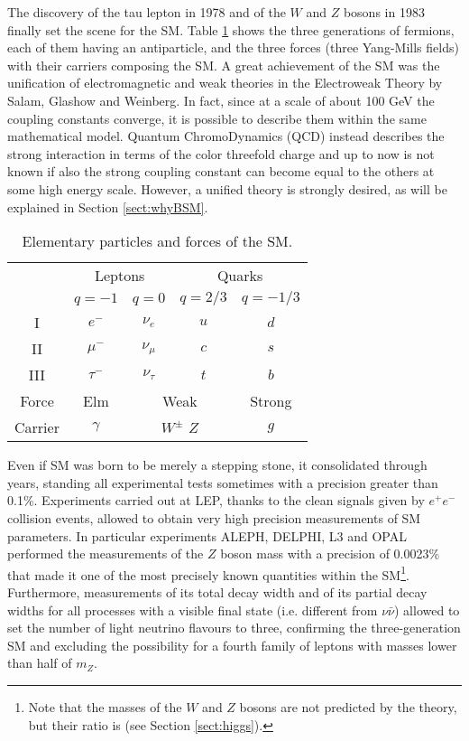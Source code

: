 The discovery of the tau lepton in 1978 and of the $W$ and $Z$ bosons in 1983 finally set the scene for the SM. Table \ref{tab:SM} shows the three generations of fermions, each of them having an antiparticle, and the three forces (three Yang-Mills fields) with their carriers composing the SM. A great achievement of the SM was the unification of electromagnetic and weak theories in the Electroweak Theory by Salam, Glashow and Weinberg. In fact, since at a scale of about 100 GeV the coupling constants converge, it is possible to describe them within the same mathematical model. Quantum ChromoDynamics (QCD) instead describes the strong interaction in terms of the color threefold charge and up to now is not known if also the strong coupling constant can become equal to the others at some high energy scale. However, a unified theory is strongly desired, as will be explained in Section \ref{sect:whyBSM}.
\begin{table}[htb]\centering\begin{tabular}{ccc|cc}
&\multicolumn{2}{c}{Leptons}&\multicolumn{2}{c}{Quarks} \\ 
& $q=-1$ & $q=0$ &$q=2/3$ &$q=-1/3$ \\ \hline
I & $e^{-}$ & $\nu_{e}$ & $u$ & $d$ \\
II & $\mu^{-}$ & $\nu_{\mu}$ & $c$ & $s$ \\
III & $\tau^{-}$ & $\nu_{\tau}$ & $t$ & $b$ \\\hline\hline
Force & Elm &\multicolumn{2}{c}{Weak}& Strong\\
Carrier & $\gamma$ & \multicolumn{2}{c}{$W^{\pm}$ \quad $Z$} & $g$\\\hline \hline
\end{tabular}\caption{Elementary particles and forces of the SM.}\label{tab:SM} \end{table}

Even if SM was born to be merely a stepping stone, it consolidated through years, standing all experimental tests sometimes with a precision greater than 0.1\%. Experiments carried out at LEP, thanks to the clean signals given by $e^{+}e^{-}$ collision events, allowed to obtain very high precision measurements of SM parameters. In particular experiments ALEPH, DELPHI, L3 and OPAL performed the measurements of the $Z$ boson mass with a precision of 0.0023\% that made it one of the most precisely known quantities within the SM\footnote{Note that the masses of the $W$ and $Z$ bosons are not predicted by the theory, but their ratio is (see Section \ref{sect:higgs}).}. Furthermore, measurements of its total decay width and of its partial decay widths for all processes with a visible final state (i.e. different from $\nu\bar\nu$) allowed to set the number of light neutrino flavours to three, confirming the three-generation SM and excluding the possibility for a fourth family of leptons with masses lower than half of $m_Z$.

